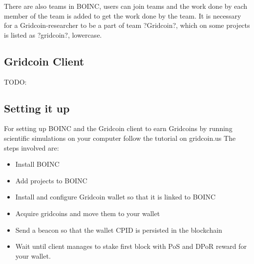 There are also teams in BOINC, users can join teams and the work done by each member of the team is added to get the work done by the team. It is necessary for a Gridcoin-researcher to be a part of team ?Gridcoin?, which on some projects is listed as ?gridcoin?, lowercase.

\subsection{Gridcoin Client}

TODO: 

\subsection{Setting it up}

For setting up BOINC and the Gridcoin client to earn Gridcoins by running scientific simulations on your computer follow the tutorial on gridcoin.us
The steps involved are:
\begin{itemize}
  \item Install BOINC
  \item Add projects to BOINC
  \item Install and configure Gridcoin wallet so that it is linked to BOINC 
  \item Acquire gridcoins and move them to your wallet
  \item Send a beacon so that the wallet CPID is persisted in the blockchain
  \item Wait until client manages to stake first block with PoS and DPoR reward for your wallet.
\end{itemize}
